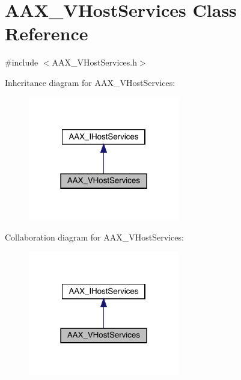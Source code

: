 \hypertarget{a01925}{}\section{A\+A\+X\+\_\+\+V\+Host\+Services Class Reference}
\label{a01925}


{\ttfamily \#include $<$A\+A\+X\+\_\+\+V\+Host\+Services.\+h$>$}



Inheritance diagram for A\+A\+X\+\_\+\+V\+Host\+Services\+:
\nopagebreak
\begin{figure}[H]
\begin{center}
\leavevmode
\includegraphics[width=187pt]{a01924}
\end{center}
\end{figure}


Collaboration diagram for A\+A\+X\+\_\+\+V\+Host\+Services\+:
\nopagebreak
\begin{figure}[H]
\begin{center}
\leavevmode
\includegraphics[width=187pt]{a01923}
\end{center}
\end{figure}


